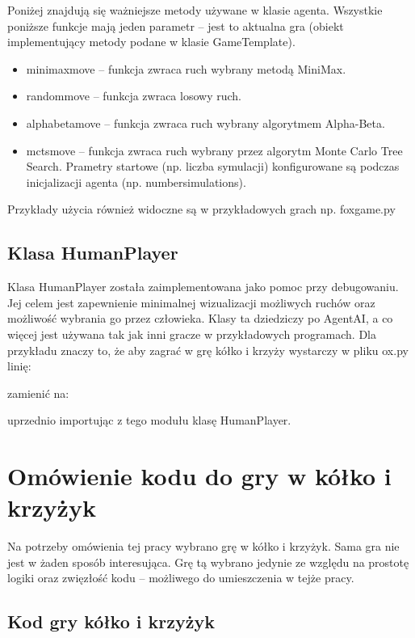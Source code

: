 \documentclass[polish,shortabstract,inz]{iithesis}
\begin{document}
Poniżej znajdują się ważniejsze metody używane w klasie agenta.
Wszystkie poniższe funkcje mają jeden parametr -- jest to aktualna gra (obiekt implementujący metody podane w klasie GameTemplate).
\begin{itemize}
  \item minimax\textunderscore move -- funkcja zwraca ruch wybrany metodą MiniMax.
  \item random\textunderscore move -- funkcja zwraca losowy ruch.
  \item alpha\textunderscore beta\textunderscore move -- funkcja zwraca ruch wybrany algorytmem Alpha-Beta.
  \item mcts\textunderscore move -- funkcja zwraca ruch wybrany przez algorytm Monte Carlo Tree Search.
  Prametry startowe (np. liczba symulacji) konfigurowane są podczas inicjalizacji agenta (np. number\textunderscore simulations).
\end{itemize}
Przykłady użycia również widoczne są w przykładowych grach np. fox\textunderscore game.py

\subsection{Klasa HumanPlayer}
Klasa HumanPlayer została zaimplementowana jako pomoc przy debugowaniu.
Jej celem jest zapewnienie minimalnej wizualizacji możliwych ruchów oraz możliwość wybrania go przez człowieka.
Klasy ta dziedziczy po AgentAI, a co więcej jest używana tak jak inni gracze w przykładowych programach.
Dla przykładu znaczy to, że aby zagrać w grę kółko i krzyży wystarczy w pliku ox.py linię:

zamienić na:

uprzednio importując z tego modułu klasę HumanPlayer.

\section{Omówienie kodu do gry w kółko i krzyżyk}
Na potrzeby omówienia tej pracy wybrano grę w kółko i krzyżyk.
Sama gra nie jest w żaden sposób interesująca.
Grę tą wybrano jedynie ze względu na prostotę logiki oraz zwięzłość kodu -- możliwego do umieszczenia w tejże pracy.
\subsection{Kod gry kółko i krzyżyk}

\end{document}
